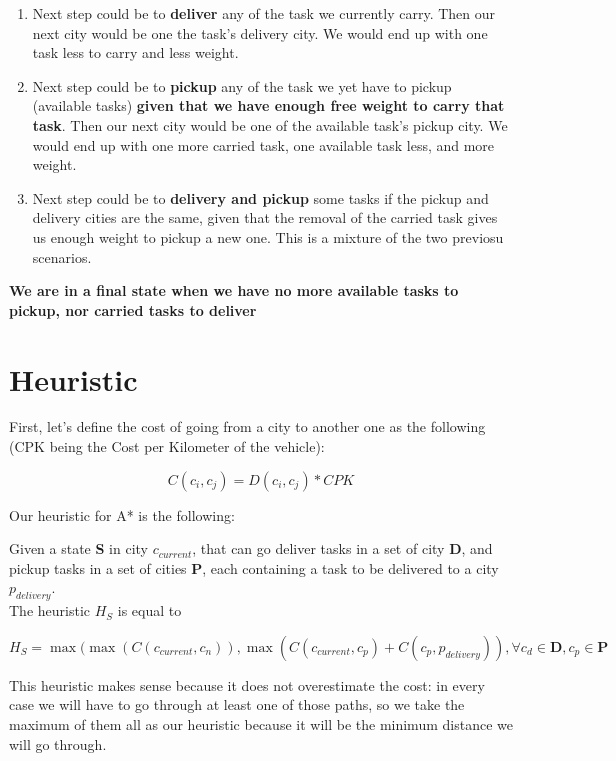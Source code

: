 \documentclass[fontsize=12pt]{scrartcl} %
\begin{document}
\begin{enumerate}

\item Next step could be to \textbf{deliver} any of the task we currently carry. Then our next city would be one the task's delivery city. We would end up with one task less to carry and less weight.

\item Next step could be to \textbf{pickup} any of the task we yet have to pickup (available tasks) \textbf{given that we have enough free weight to carry that task}. Then our next city would be one of the available task's pickup city. We would end up with one more carried task, one available task less, and more weight.
\item Next step could be to \textbf{delivery and pickup} some tasks if the pickup and delivery cities are the same, given that the removal of the carried task gives us enough weight to pickup a new one. This is a mixture of the two previosu scenarios.

\end{enumerate}


\textbf{We are in a final state when we have no more available tasks to pickup, nor carried tasks to deliver}


\section*{Heuristic}

First, let's define the cost of going from a city to another one as the following (CPK being the Cost per Kilometer of the vehicle): 

$$ C(c_i, c_j) = D(c_i, c_j) * CPK $$


Our heuristic for A* is the following:

Given a state \textbf{S} in city $c_{current}$, that can go deliver tasks in a set of city \textbf{D}, and pickup tasks in a set of cities \textbf{P}, each containing a task to be delivered to a city \textbf{$p_{delivery}$}. \\
The heuristic $H_S$ is equal to 

$$ H_S = \max(\max(C(c_{current}, c_n)), \max(C(c_{current}, c_p) + C(c_p, p_{delivery}) ), \forall c_d \in \textbf{D}, c_p \in \textbf{P} $$


This heuristic makes sense because it does not overestimate the cost: in every case we will have to go through at least one of those paths, so we take the maximum of them all as our heuristic because it will be the minimum distance we will go through. \\ \\
\end{document}
